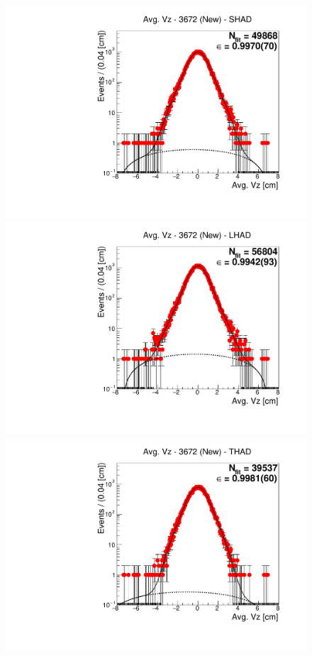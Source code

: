 \begin{figure}[H]
\centering
\includegraphics[scale=0.25]{figures/plots/nonDDbar_fit_results/3650_new/fit_new_3671_data_SHAD.pdf}
\hspace{-0.5cm}
\includegraphics[scale=0.25]{figures/plots/nonDDbar_fit_results/3650_new/fit_new_3671_data_LHAD.pdf}
\hspace{-0.5cm}
\includegraphics[scale=0.25]{figures/plots/nonDDbar_fit_results/3650_new/fit_new_3671_data_THAD.pdf}

\end{figure}
